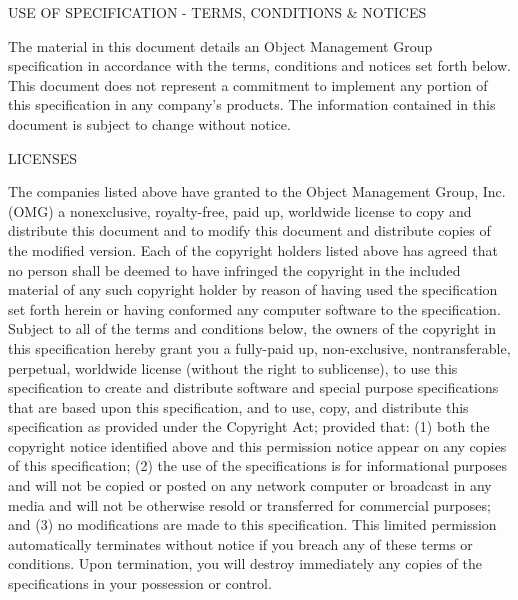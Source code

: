 
\begin{center}USE OF SPECIFICATION - TERMS, CONDITIONS \& NOTICES\end{center}\vspace{-3mm}
The material in this document details an Object Management Group specification in accordance with the terms, conditions and notices set forth below. This document does not represent a commitment to implement any portion of this specification in any company's products. The information contained in this document is subject to change without notice.

\begin{center}LICENSES\end{center}\vspace{-3mm}
The companies listed above have granted to the Object Management Group, Inc. (OMG) a nonexclusive, royalty-free, paid up, worldwide license to copy and distribute this document and to modify this document and distribute copies of the modified version. Each of the copyright holders listed above has agreed that no person shall be deemed to have infringed the copyright in the included material of any such copyright holder by reason of having used the specification set forth herein or having conformed any computer software to the specification.
Subject to all of the terms and conditions below, the owners of the copyright in this specification hereby grant you a fully-paid up, non-exclusive, nontransferable, perpetual, worldwide license (without the right to sublicense), to use this specification to create and distribute software and special purpose specifications that are based upon this specification, and to use, copy, and distribute this specification as provided under the Copyright Act; provided that: (1) both the copyright notice identified above and this permission notice appear on any copies of this specification; (2) the use of the specifications is for informational purposes and will not be copied or posted on any network computer or broadcast in any media and will not be otherwise resold or transferred for commercial purposes; and (3) no modifications are made to this specification. This limited permission automatically terminates without notice if you breach any of these terms or conditions. Upon termination, you will destroy immediately any copies of the specifications in your possession or control. 

